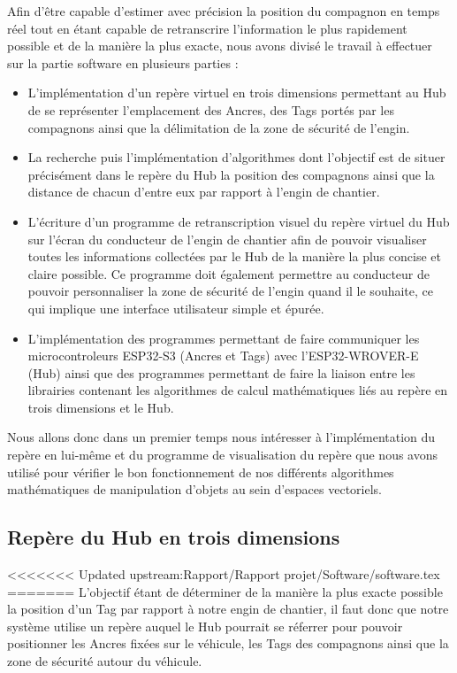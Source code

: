 
Afin d'être capable d'estimer avec précision la position du compagnon en temps réel tout en étant capable de retranscrire l'information le plus rapidement possible et de la manière la plus exacte, nous avons divisé le travail à effectuer sur la partie software en plusieurs parties :

\begin{itemize}
    \item L'implémentation d'un repère virtuel en trois dimensions permettant au Hub de se représenter l'emplacement des Ancres, des Tags portés par les compagnons ainsi que la délimitation de la zone de sécurité de l'engin.
    \item La recherche puis l'implémentation d'algorithmes dont l'objectif est de situer précisément dans le repère du Hub la position des compagnons ainsi que la distance de chacun d'entre eux par rapport à l'engin de chantier.
    \item L'écriture d'un programme de retranscription visuel du repère virtuel du Hub sur l'écran du conducteur de l'engin de chantier afin de pouvoir visualiser toutes les informations collectées par le Hub de la manière la plus concise et claire possible. Ce programme doit également permettre au conducteur de pouvoir personnaliser la zone de sécurité de l'engin quand il le souhaite, ce qui implique une interface utilisateur simple et épurée.
    \item L'implémentation des programmes permettant de faire communiquer les microcontroleurs ESP32-S3 (Ancres et Tags) avec l'ESP32-WROVER-E (Hub) ainsi que des programmes permettant de faire la liaison entre les librairies contenant les algorithmes de calcul mathématiques liés au repère en trois dimensions et le Hub.
\end{itemize}
\bigskip %
Nous allons donc dans un premier temps nous intéresser à l'implémentation du repère en lui-même et du programme de visualisation du repère que nous avons utilisé pour vérifier le bon fonctionnement de nos différents algorithmes mathématiques de manipulation d'objets au sein d'espaces vectoriels.

\subsection{Repère du Hub en trois dimensions}

<<<<<<< Updated upstream:Rapport/Rapport projet/Software/software.tex
=======
L'objectif étant de déterminer de la manière la plus exacte possible la position d'un Tag par rapport à notre engin de chantier, il faut donc que notre système utilise un repère auquel le Hub pourrait se réferrer pour pouvoir positionner les Ancres fixées sur le véhicule, les Tags des compagnons ainsi que la zone de sécurité autour du véhicule.


